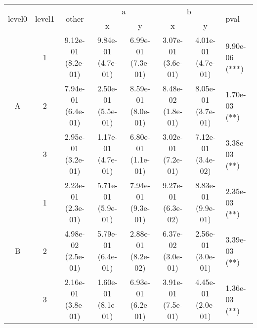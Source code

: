 \begin{tabular}{cccccccl}
\toprule
\multirow{2}{*}{level0} & \multirow{2}{*}{level1}& \multirow{2}{*}{other}&\multicolumn{2}{c}{a}&\multicolumn{2}{c}{b}& \multirow{2}{*}{pval}\tabularnewline
\cmidrule(lr){4-5}
\cmidrule(lr){6-7}
&&&x&y&x&y\tabularnewline
\midrule
\multirow{3}{*}{A}&1& 9.12e-01 (8.2e-01)& 9.84e-01 (4.7e-01)& 6.99e-01 (7.3e-01)& 3.07e-01 (3.6e-01)& 4.01e-01 (4.7e-01)& 9.90e-06 (***)\tabularnewline
&2& 7.94e-01 (6.4e-01)& 2.50e-01 (5.5e-01)& 8.59e-01 (8.0e-01)& 8.48e-02 (1.8e-01)& 8.05e-01 (3.7e-01)& 1.70e-03 (**)\tabularnewline
&3& 2.95e-01 (3.2e-01)& 1.17e-01 (4.7e-01)& 6.80e-01 (1.1e-01)& 3.02e-01 (7.2e-01)& 7.12e-01 (3.4e-02)& 3.38e-03 (**)\tabularnewline
\midrule
\multirow{3}{*}{B}&1& 2.23e-01 (2.3e-01)& 5.71e-01 (5.9e-01)& 7.94e-01 (9.3e-01)& 9.27e-01 (6.3e-02)& 8.83e-01 (9.9e-01)& 2.35e-03 (**)\tabularnewline
&2& 4.98e-02 (2.5e-01)& 5.79e-01 (6.4e-01)& 2.88e-01 (8.2e-02)& 6.37e-02 (3.0e-01)& 2.56e-01 (3.0e-01)& 3.39e-03 (**)\tabularnewline
&3& 2.16e-01 (3.8e-01)& 1.60e-01 (8.1e-01)& 6.93e-01 (6.2e-01)& 3.91e-01 (7.5e-01)& 4.45e-01 (2.0e-01)& 1.36e-03 (**)\tabularnewline
\bottomrule
\end{tabular}
